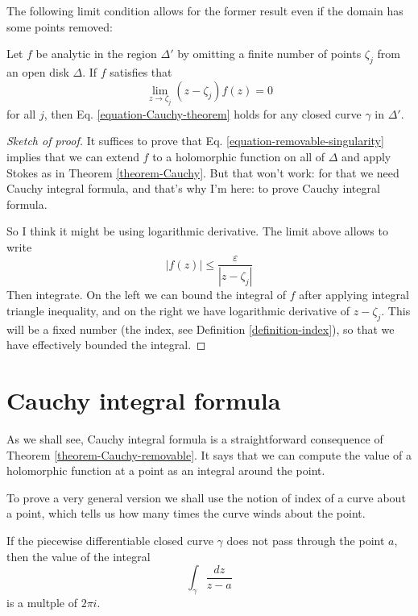 The following limit condition allows for the former result even if the domain
has some points removed:

\begin{theorem}
\label{theorem-Cauchy-removable}
Let $f$ be analytic in the region $\Delta'$ by omitting a finite number of
points $\zeta_j$ from an open disk $\Delta$. If $f$ satisfies that
\begin{equation}
\label{equation-removable-singularity}
\lim_{z\to\zeta_j} (z-\zeta_j)f(z)=0
\end{equation}
for all $j$, then Eq. \ref{equation-Cauchy-theorem} holds for any closed curve
$\gamma$ in $\Delta'$.
\end{theorem}

\begin{proof}[Sketch of proof]
It suffices to prove that Eq. \ref{equation-removable-singularity} implies that
we can extend $f$ to a holomorphic function on all of $\Delta$ and apply Stokes
as in Theorem \ref{theorem-Cauchy}. But that won't work: for that we need Cauchy
integral formula, and that's why I'm here: to prove Cauchy integral formula.

So I think it might be using logarithmic derivative. The limit above allows to
write
$$
|f(z)|\leq \frac{\varepsilon}{|z-\zeta_j|}
$$
Then integrate. On the left we can bound the integral of $f$ after applying
integral triangle inequality, and on the right we have logarithmic derivative of
$z-\zeta_j$. This will be a fixed number (the index, see Definition
\ref{definition-index}), so that we have effectively bounded the integral.
\end{proof}

\section{Cauchy integral formula}
\label{section-Cauchy-integral-formula}

As we shall see, Cauchy integral formula is a straightforward consequence of
Theorem \ref{theorem-Cauchy-removable}. It says that we can compute the value of
a holomorphic function at a point as an integral around the point.

To prove a very general version we shall use the notion of index of a curve
about a point, which tells us how many times the curve winds about the point.

\begin{lemma}
\label{lemma-index-is-multiple-of-2pii}
\begin{reference}
\cite[Section 2.2, Lemma 1]{ahl}
\end{reference}
If the piecewise differentiable closed curve $\gamma$ does not pass through the
point $a$, then the value of the integral
$$
\int_\gamma\frac{dz}{z-a}
$$
is a multple of $2\pi i$.
\end{lemma}

